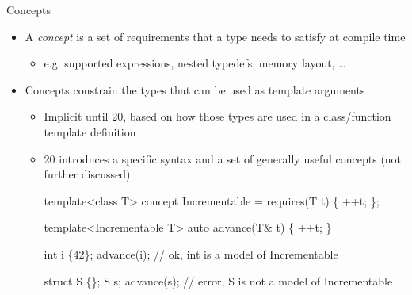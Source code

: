 \begin{frame}[fragile]{Concepts}

  \begin{itemize}
  \item A \textit{concept} is a set of requirements that a type needs to satisfy
    at compile time
    \begin{itemize}
    \item e.g. supported expressions, nested typedefs, memory layout, \ldots
    \end{itemize}

  \item<2-> Concepts constrain the types that can be used as template arguments
    \begin{itemize}
    \item Implicit until \Cpp{}20, based on how those types are used in a
      class/function template definition

    \item<3-> \Cpp{}20 introduces a specific syntax and a set of generally useful
      concepts (not further discussed)
      \begin{codeblock}
template<class T>
concept Incrementable = requires(T t) \{ ++t; \};

template<Incrementable T>
auto advance(T& t) \{ ++t; \}

int i \{42\};
advance(i); // ok, int is a model of Incrementable

struct S \{\};
S s;
advance(s); // error, S is not a model of Incrementable\end{codeblock}
    \end{itemize}
  \end{itemize}

\end{frame}

